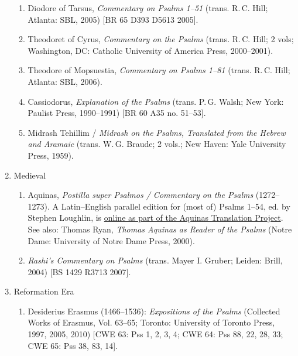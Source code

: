 \documentclass[titlepage]{article}
\begin{document}
\begin{enumerate}
\begin{enumerate}
	\item Diodore of Tarsus, \emph{Commentary on Psalms 1--51} (trans. R.\,C. Hill; Atlanta: SBL, 2005) [BR 65 D393 D5613 2005].

	\item Theodoret of Cyrus, \emph{Commentary on the Psalms} (trans. R.\,C. Hill; 2 vols; Washington, DC: Catholic University of America Press, 2000--2001).

	\item Theodore of Mopsuestia, \emph{Commentary on Psalms 1--81} (trans. R.\,C. Hill; Atlanta: SBL, 2006).

	\item Cassiodorus, \emph{Explanation of the Psalms} (trans. P.\,G. Walsh; New York: Paulist Press, 1990--1991) [BR 60 A35 no. 51--53].

	\item Midrash Tehillim / \emph{Midrash on the Psalms, Translated from the Hebrew and Aramaic} (trans. W.\,G. Braude; 2 vols.; New Haven: Yale University Press, 1959).

  \end{enumerate}
 \item Medieval
  \begin{enumerate}

	\item Aquinas, \emph{Postilla super Psalmos / Commentary on the Psalms} (1272--1273). A Latin--English parallel edition for (most of) Psalms 1--54, ed. by Stephen Loughlin, is \href{http://www4.desales.edu/~philtheo/loughlin/ATP/}{online as part of the Aquinas Translation Project}. See also: Thomas Ryan, \emph{Thomas Aquinas as Reader of the Psalms} (Notre Dame: University of Notre Dame Press, 2000).

	\item \emph{Rashi’s Commentary on Psalms} (trans. Mayer I. Gruber; Leiden: Brill, 2004) [BS 1429 R3713 2007].%

  \end{enumerate}
 \item Reformation Era
  \begin{enumerate}

	\item Desiderius Erasmus (1466--1536): \emph{Expositions of the Psalms} (Collected Works of Erasmus, Vol. 63--65; Toronto: University of Toronto Press, 1997, 2005, 2010) [CWE 63: Pss 1, 2, 3, 4; CWE 64: Pss 88, 22, 28, 33; CWE 65: Pss 38, 83, 14].


\end{enumerate}
\end{enumerate}
\end{document}
